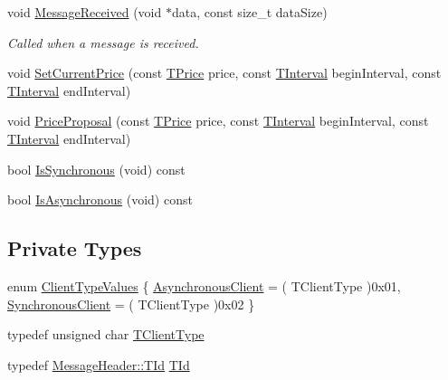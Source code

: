 \begin{DoxyCompactItemize}
void \hyperlink{class_client_manager_abf05d2ac88337dfd02e0b7986ee1e18c}{Message\-Received} (void $\ast$data, const size\-\_\-t data\-Size)
\begin{DoxyCompactList}\small\item\em Called when a message is received. \end{DoxyCompactList}\item 
void \hyperlink{class_client_manager_adb64a2ee5d0eb7b1a4bdedcd0e3b92f5}{Set\-Current\-Price} (const \hyperlink{class_client_manager_ae957a71b432eb6d9d39b0f397cd89874}{T\-Price} price, const \hyperlink{class_client_manager_a429cc3229a8121c83655945ebaec18a6}{T\-Interval} begin\-Interval, const \hyperlink{class_client_manager_a429cc3229a8121c83655945ebaec18a6}{T\-Interval} end\-Interval)
\item 
void \hyperlink{class_client_manager_ae297765312b5f2f93f7b8ec700ad2fbb}{Price\-Proposal} (const \hyperlink{class_client_manager_ae957a71b432eb6d9d39b0f397cd89874}{T\-Price} price, const \hyperlink{class_client_manager_a429cc3229a8121c83655945ebaec18a6}{T\-Interval} begin\-Interval, const \hyperlink{class_client_manager_a429cc3229a8121c83655945ebaec18a6}{T\-Interval} end\-Interval)
\item 
bool \hyperlink{class_client_manager_a626b9383b2b2b7924a1f1e183800fe72}{Is\-Synchronous} (void) const 
\item 
bool \hyperlink{class_client_manager_ab3f0c2bb301ba8d1218d703e5446baf3}{Is\-Asynchronous} (void) const 
\end{DoxyCompactItemize}
\subsection*{Private Types}
\begin{DoxyCompactItemize}
\item 
enum \hyperlink{class_client_manager_ac12239be9a30847f677a32910822d40b}{Client\-Type\-Values} \{ \hyperlink{class_client_manager_ac12239be9a30847f677a32910822d40ba5efa5897435cfd442d637beea251c85a}{Asynchronous\-Client} = ( T\-Client\-Type )0x01, 
\hyperlink{class_client_manager_ac12239be9a30847f677a32910822d40bada4fe5ba56979f1deaf93b69d0a8fcae}{Synchronous\-Client} = ( T\-Client\-Type )0x02
 \}
\item 
typedef unsigned char \hyperlink{class_client_manager_a223aecacabe855f08e4675b12403dfa4}{T\-Client\-Type}
\item 
typedef \hyperlink{class_terra_swarm_1_1_message_header_ab55de822fadad758edcd8f36bd07676e}{Message\-Header\-::\-T\-Id} \hyperlink{class_client_manager_a531e5e7eb779e8ce3c47b8eabd8e9b17}{T\-Id}
\end{DoxyCompactItemize}
